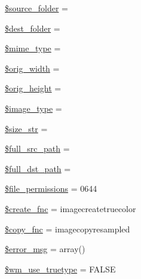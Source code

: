 \begin{DoxyCompactItemize}
\item 
\mbox{\hyperlink{class_c_i___image__lib_a8fa5462b549251df178487f869c49800}{\$source\+\_\+folder}} = \textquotesingle{}\textquotesingle{}
\item 
\mbox{\hyperlink{class_c_i___image__lib_a23c580d10b1ba89c5b532f43fe2c6f59}{\$dest\+\_\+folder}} = \textquotesingle{}\textquotesingle{}
\item 
\mbox{\hyperlink{class_c_i___image__lib_a4d1985caafb49b059e3ca3dedfee257a}{\$mime\+\_\+type}} = \textquotesingle{}\textquotesingle{}
\item 
\mbox{\hyperlink{class_c_i___image__lib_a336a3be3539aaae0ad42aaf4c544bb41}{\$orig\+\_\+width}} = \textquotesingle{}\textquotesingle{}
\item 
\mbox{\hyperlink{class_c_i___image__lib_a68713f45d7d236dfdd6aafdc9668a44d}{\$orig\+\_\+height}} = \textquotesingle{}\textquotesingle{}
\item 
\mbox{\hyperlink{class_c_i___image__lib_a939d6733d998cce893403d2f59f40317}{\$image\+\_\+type}} = \textquotesingle{}\textquotesingle{}
\item 
\mbox{\hyperlink{class_c_i___image__lib_aff68567b98390e0db61065df80af5d49}{\$size\+\_\+str}} = \textquotesingle{}\textquotesingle{}
\item 
\mbox{\hyperlink{class_c_i___image__lib_a7ccf54c8f559eaf70600f69554be39eb}{\$full\+\_\+src\+\_\+path}} = \textquotesingle{}\textquotesingle{}
\item 
\mbox{\hyperlink{class_c_i___image__lib_aa830804dc9d15c51e0672bd4d3602e07}{\$full\+\_\+dst\+\_\+path}} = \textquotesingle{}\textquotesingle{}
\item 
\mbox{\hyperlink{class_c_i___image__lib_abeba5c64fb89ae12956958b88a58f9bf}{\$file\+\_\+permissions}} = 0644
\item 
\mbox{\hyperlink{class_c_i___image__lib_af70f0124d1a34ec7b7360bee16c3a3ea}{\$create\+\_\+fnc}} = \textquotesingle{}imagecreatetruecolor\textquotesingle{}
\item 
\mbox{\hyperlink{class_c_i___image__lib_a4c7eeae509bbd8ac493cafa8a5b9980e}{\$copy\+\_\+fnc}} = \textquotesingle{}imagecopyresampled\textquotesingle{}
\item 
\mbox{\hyperlink{class_c_i___image__lib_acf910733622c1fa671b9f755c69c2ec7}{\$error\+\_\+msg}} = array()
\item 
\mbox{\hyperlink{class_c_i___image__lib_a0415d8aa18349f21751f7a81255918ad}{\$wm\+\_\+use\+\_\+truetype}} = F\+A\+L\+SE
\end{DoxyCompactItemize}
